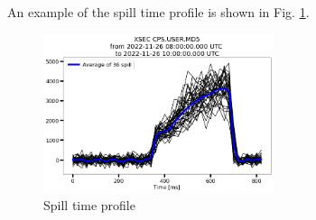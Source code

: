 An example of the spill time profile is shown in Fig. \ref{fig:spill_time_profile}.

\begin{figure}[!htb]
\centering
\includegraphics[width=0.6\textwidth]{images/Pasted image 20221130110602.png}
\caption{Spill time profile}
\label{fig:spill_time_profile}
\end{figure}